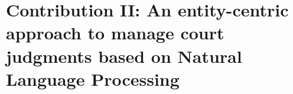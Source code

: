 \section{Contribution II: An entity-centric approach to manage court judgments based on Natural Language Processing}
